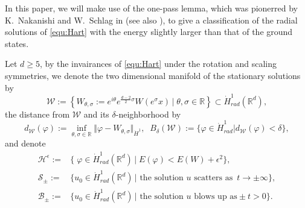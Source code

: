\documentclass[reqno, 11pt]{amsart}
\numberwithin{equation}{section}
\newcommand{\R}{\mathbb{R}}
\theoremstyle{plain}
\theoremstyle{definition}
\numberwithin{equation}{section}
\numberwithin{theorem}{section}
\numberwithin{equation}{section}
\numberwithin{equation}{section}
\numberwithin{theorem}{section}
\begin{document}
	
	
	In this paper,  we will make use of the one-pass lemma, which was pionerred by K.~Nakanishi and W.~Schlag in \cite{NakR, NakS:NLKG, NakS:NLS, NakS:NLKG:non} (see also \cite{KriNS:NLKG, KriNS:NLW rad, KriNS:NLW non, NakS:book,Roy}), to give a classification of the radial solutions of \eqref{equ:Hart} with the energy slightly larger than that of the ground states. 
	
	Let $d\geq 5$,  by the invairances of \eqref{equ:Hart} under the rotation and scaling symmetries,  we denote the two dimensional manifold of the stationary solutions by
	\begin{equation*}
	\mathcal{W}:=\left\{W_{\theta,\sigma}:=e^{i\theta}e^{\frac{d-2}{2}\sigma}W(e^{\sigma}x)\, |\; \theta,\sigma\in \R \right\}\subset\dot H^1_{rad}(\R^d),
	\end{equation*} 
	the distance from $\mathcal{W}$ and its $\delta$-neighborhood  by
	\begin{equation*}
	d_{\mathcal{W}} (\varphi):=\inf_{\theta,\sigma \in \R} {\Vert{\varphi-W_{\theta,\sigma}} \Vert}_{\dot H^1} , \;\; 
	B_{\delta}(\mathcal{W}):=\{\varphi \in \dot H^1_{rad} |d_{\mathcal{W}} (\varphi)<\delta\},
	\end{equation*}
	and denote
	\begin{equation*} 
	\begin{aligned}
	\mathcal{H}^{\epsilon}:=&\{\; \varphi\in\dot H^1_{rad}(\R^d) \, |\;E(\varphi)<E(W)+\epsilon^2 \},\\
	\mathcal{S}_{\pm}:=&\{u_0\in\dot H^1_{rad} (\R^d)\, |\text{ the solution $u$ scatters as} \enspace t\rightarrow\pm\infty\}, \\
	\mathcal{B}_{\pm}:=&\{u_0\in\dot H^1_{rad} (\R^d)\, |\text{ the solution $u$ blows up as} \pm t>0 \}.
	\end{aligned}
	\end{equation*}
\end{document}
